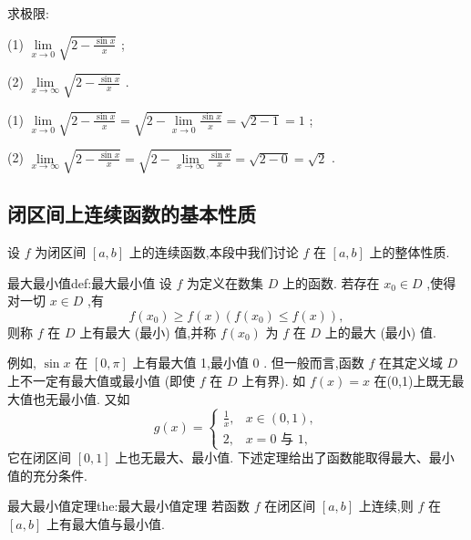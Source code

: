 \begin{example}
求极限:

(1) \(\mathop{\lim }\limits_{{x \rightarrow  0}}\sqrt{2 - \frac{\sin x}{x}}\) ;

(2) \(\mathop{\lim }\limits_{{x \rightarrow  \infty }}\sqrt{2 - \frac{\sin x}{x}}\) .
\end{example}


\begin{solution}
(1) \(\mathop{\lim }\limits_{{x \rightarrow  0}}\sqrt{2 - \frac{\sin x}{x}} = \sqrt{2 - \mathop{\lim }\limits_{{x \rightarrow  0}}\frac{\sin x}{x}} = \sqrt{2 - 1} = 1\) ;

(2) \(\mathop{\lim }\limits_{{x \rightarrow  \infty }}\sqrt{2 - \frac{\sin x}{x}} = \sqrt{2 - \mathop{\lim }\limits_{{x \rightarrow  \infty }}\frac{\sin x}{x}} = \sqrt{2 - 0} = \sqrt{2}\) .
\end{solution}


\subsection{闭区间上连续函数的基本性质}

设 \(f\) 为闭区间 \(\left\lbrack  {a,b}\right\rbrack\) 上的连续函数,本段中我们讨论 \(f\) 在 \(\left\lbrack  {a,b}\right\rbrack\) 上的整体性质.

\begin{definition}{最大最小值}{def:最大最小值}
设 \(f\) 为定义在数集 \(D\) 上的函数. 若存在 \({x}_{0} \in  D\) ,使得对一切 \(x \in  D\) ,有
\[
f\left( {x}_{0}\right)  \geq  f\left( x\right) \left( {f\left( {x}_{0}\right)  \leq  f\left( x\right) }\right) ,
\]
则称 \(f\) 在 \(D\) 上有最大 (最小) 值,并称 \(f\left( {x}_{0}\right)\) 为 \(f\) 在 \(D\) 上的最大 (最小) 值.
\end{definition}


例如, \(\sin x\) 在 \(\left\lbrack  {0,\pi }\right\rbrack\) 上有最大值 1,最小值 0 . 但一般而言,函数 \(f\) 在其定义域 \(D\) 上不一定有最大值或最小值 (即使 \(f\) 在 \(D\) 上有界). 如 \(f\left( x\right)  = x\) 在(0,1)上既无最大值也无最小值. 又如
\[
g\left( x\right)  = \left\{  \begin{array}{ll} \frac{1}{x}, & x \in  \left( {0,1}\right) , \\  2, & x = 0\text{ 与 }1, \end{array}\right.  \tag{4}
\]
它在闭区间 \(\left\lbrack  {0,1}\right\rbrack\) 上也无最大、最小值. 下述定理给出了函数能取得最大、最小值的充分条件.

\begin{theorem}{最大最小值定理}{the:最大最小值定理}
若函数 \(f\) 在闭区间 \(\left\lbrack  {a,b}\right\rbrack\) 上连续,则 \(f\) 在 \(\left\lbrack  {a,b}\right\rbrack\) 上有最大值与最小值.
\end{theorem}


